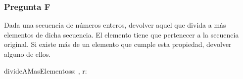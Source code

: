 \subsubsection{Pregunta F}

Dada una secuencia de números enteros, devolver aquel que divida a más elementos de dicha secuencia. El elemento tiene que pertenecer a la secuencia original. Si existe más de un elemento que cumple esta propiedad, devolver alguno de ellos.


\begin{proc}{divideAMasElementos}{\In s: \TLista{\ent}, \Out r: \ent}{}
\end{proc}


